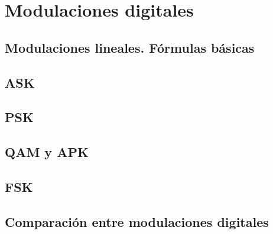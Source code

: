 \documentclass[a4paper]{book}
\begin{document}
\chapter{Modulaciones digitales}
\section{Modulaciones lineales. Fórmulas básicas}
\section{ASK}
\section{PSK}
\section{QAM y APK}
\section{FSK}
\section{Comparación entre modulaciones digitales}


%
\end{document}
